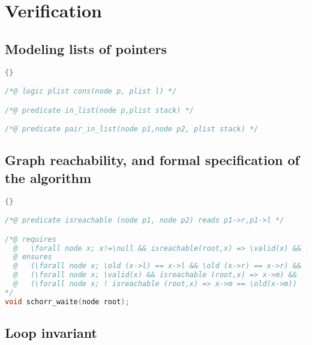 
\section{Verification}

\subsection{Modeling lists of pointers}

\begin{lstlisting}[language=C]{}

/*@ logic plist cons(node p, plist l) */

/*@ predicate in_list(node p,plist stack) */

/*@ predicate pair_in_list(node p1,node p2, plist stack) */

\end{lstlisting}

\subsection{Graph reachability, and formal specification of the algorithm}

\begin{lstlisting}[language=C]{}

/*@ predicate isreachable (node p1, node p2) reads p1->r,p1->l */

/*@ requires 
  @   \forall node x; x!=\null && isreachable(root,x) => \valid(x) && ! x ->m  
  @ ensures 
  @   (\forall node x; \old (x->l) == x->l && \old (x->r) == x->r) &&
  @   (\forall node x; \valid(x) && isreachable (root,x) => x->m) &&
  @   (\forall node x; ! isreachable (root,x) => x->m == \old(x->m))
*/
void schorr_waite(node root);
\end{lstlisting}

\subsection{Loop invariant}

